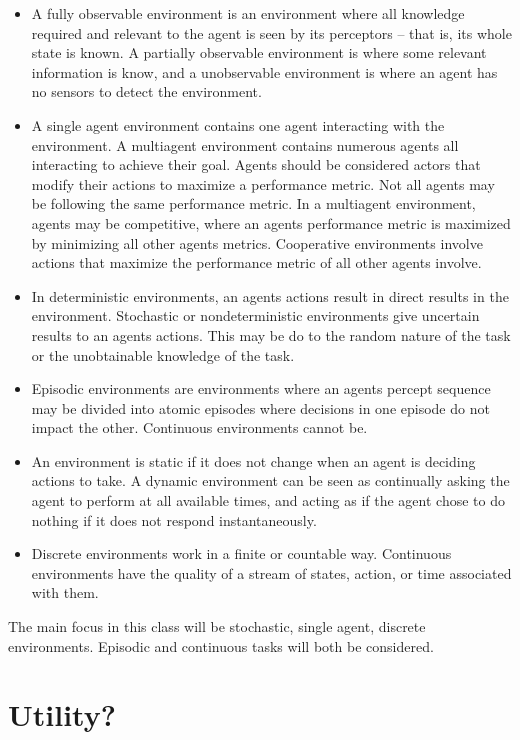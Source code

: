 \documentclass{report}
\begin{document}
\begin{itemize}
  \item A fully observable environment is an environment where all knowledge required and relevant to the agent is seen by its perceptors -- that is, its whole state is known. A partially observable environment is where some relevant information is know, and a unobservable environment is where an agent has no sensors to detect the environment.
  \item A single agent environment contains one agent interacting with the environment. A multiagent environment contains numerous agents all interacting to achieve their goal. Agents should be considered actors that modify their actions to maximize a performance metric. Not all agents may be following the same performance metric. In a multiagent environment, agents may be competitive, where an agents performance metric is maximized by minimizing all other agents metrics. Cooperative environments involve actions that maximize the performance metric of all other agents involve.
  \item In deterministic environments, an agents actions result in direct results in the environment. Stochastic or nondeterministic environments give uncertain results to an agents actions. This may be do to the random nature of the task or the unobtainable knowledge of the task.
  \item Episodic environments are environments where an agents percept sequence may be divided into atomic episodes where decisions in one episode do not impact the other. Continuous environments cannot be.
  \item An environment is static if it does not change when an agent is deciding actions to take. A dynamic environment can be seen as continually asking the agent to perform at all available times, and acting as if the agent chose to do nothing if it does not respond instantaneously.
  \item Discrete environments work in a finite or countable way. Continuous environments have the quality of a stream of states, action, or time associated with them.
\end{itemize}

The main focus in this class will be stochastic, single agent, discrete environments. Episodic and continuous tasks will both be considered.

\chapter{Utility?}
\end{document}
